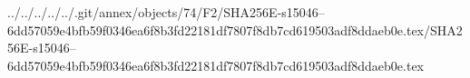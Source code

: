 ../../../../../.git/annex/objects/74/F2/SHA256E-s15046--6dd57059e4bfb59f0346ea6f8b3fd22181df7807f8db7cd619503adf8ddaeb0e.tex/SHA256E-s15046--6dd57059e4bfb59f0346ea6f8b3fd22181df7807f8db7cd619503adf8ddaeb0e.tex